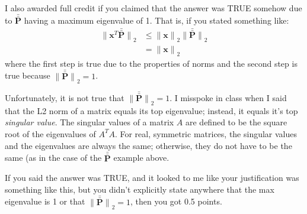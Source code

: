 \documentclass[10pt]{exam}
\theoremstyle{definition}
\newcommand{\p}{\mathbf P}
\newcommand{\pb}{\bar {\p}}
\newcommand{\pbb}{\bar {\pb}}
\newcommand{\trans}[1]{{#1}^{T}}
\newcommand{\x}{\mathbf x}
\newcommand{\ltwo}[1]{{\lVert {#1} \rVert}_2}
\begin{document}
\begin{solution}
    I also awarded full credit if you claimed that the answer was TRUE somehow due to $\pbb$ having a maximum eigenvalue of 1.
    That is, if you stated something like:
    \begin{align}
        \ltwo{\trans\x\pbb}
        &\le
        \ltwo{\x}\ltwo{\pbb} \\
        &=
        \ltwo{\x}
    \end{align}
    where the first step is true due to the properties of norms and the second step is true because $\ltwo{\pbb} = 1$.

    Unfortunately, it is not true that $\ltwo{\pbb}=1$.
    I misspoke in class when I said that the L2 norm of a matrix equals its top eigenvalue;
    instead, it equals it's top \emph{singular value}.
    The singular values of a matrix $A$ are defined to be the square root of the eigenvalues of $\trans A A$.
    For real, symmetric matrices, the singular values and the eigenvalues are always the same;
    otherwise, they do not have to be the same (as in the case of the $\pbb$ example above.



    If you said the answer was TRUE, and it looked to me like your justification was something like this, but you didn't explicitly state anywhere that the max eigenvalue is 1 or that $\ltwo{\pbb}=1$, then you got 0.5 points.
\end{solution}
\end{document}
